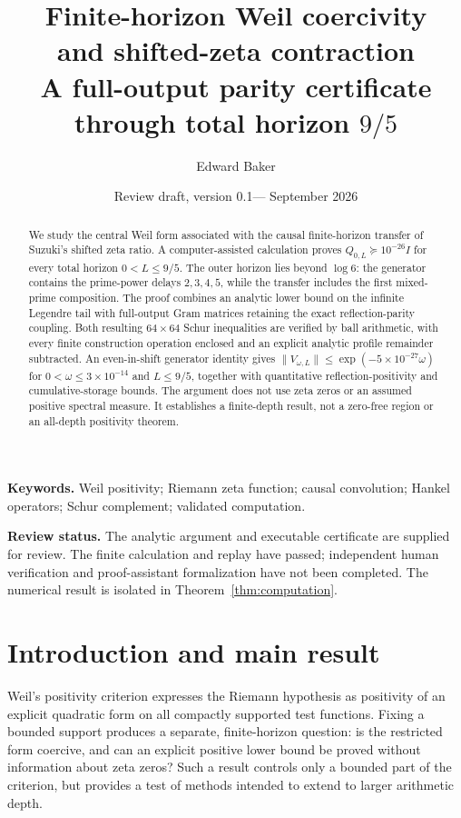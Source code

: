 \documentclass[11pt]{article}
\title{Finite-horizon Weil coercivity\protect\\ and shifted-zeta contraction\protect\\[5pt]
\large A full-output parity certificate through total horizon $9/5$}
\author{Edward Baker}
\date{Review draft, version 0.1\quad---\quad 9 September 2026}
\numberwithin{equation}{section}
\theoremstyle{definition}
\theoremstyle{remark}
\newcommand{\norm}[1]{\lVert#1\rVert}
\begin{document}
\maketitle
\begin{abstract}
We study the central Weil form associated with the causal finite-horizon
transfer of Suzuki's shifted zeta ratio. A computer-assisted calculation proves
$Q_{0,L}\succeq10^{-26}I$ for every total horizon $0<L\le9/5$.
The outer horizon lies beyond $\log6$: the generator contains the prime-power
delays $2,3,4,5$, while the transfer includes the first mixed-prime composition.
The proof combines an analytic lower bound on the infinite Legendre tail with
full-output Gram matrices retaining the exact reflection-parity coupling.
Both resulting $64\times64$ Schur inequalities are verified by ball arithmetic,
with every finite construction operation enclosed and an explicit analytic
profile remainder subtracted. An even-in-shift generator identity gives
$\norm{V_{\omega,L}}\le\exp(-5\times10^{-27}\omega)$ for
$0<\omega\le3\times10^{-14}$ and $L\le9/5$, together with quantitative
reflection-positivity and cumulative-storage bounds. The argument does not use
zeta zeros or an assumed positive spectral measure. It establishes a
finite-depth result, not a zero-free region or an all-depth positivity theorem.
\end{abstract}

\noindent\textbf{Keywords.} Weil positivity; Riemann zeta function; causal
convolution; Hankel operators; Schur complement; validated computation.

\smallskip
\noindent\textbf{Review status.} The analytic argument and executable
certificate are supplied for review. The finite calculation and replay have
passed; independent human verification and proof-assistant formalization have
not been completed. The numerical result is isolated in
Theorem~\ref{thm:computation}.

\section{Introduction and main result}

Weil's positivity criterion expresses the Riemann hypothesis as positivity of
an explicit quadratic form on all compactly supported test functions. Fixing
a bounded support produces a separate, finite-horizon question: is the
restricted form coercive, and can an explicit positive lower bound be proved
without information about zeta zeros? Such a result controls only a bounded
part of the criterion, but provides a test of methods intended to extend to
larger arithmetic depth.
\end{document}
